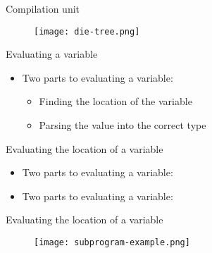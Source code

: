 
\begin{frame}{Compilation unit}
	\begin{figure}
		\texttt{[image: die-tree.png]}
	\end{figure}
\end{frame}


\begin{frame}{Evaluating a variable}
    \begin{itemize}
        \item Two parts to evaluating a variable:
    	\begin{itemize}
    	    \item Finding the location of the variable
    	    \item Parsing the value into the correct type
    	\end{itemize}
    \end{itemize}
\end{frame}


\begin{frame}{Evaluating the location of a variable}
    \begin{itemize}
        \item Two parts to evaluating a variable:
        \item Two parts to evaluating a variable:
    \end{itemize}
\end{frame}


\begin{frame}{Evaluating the location of a variable}
	\begin{figure}
		\texttt{[image: subprogram-example.png]}
	\end{figure}
\end{frame}


